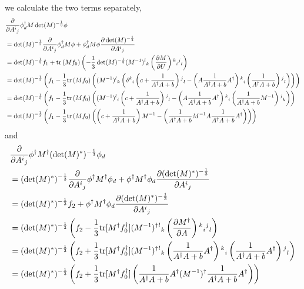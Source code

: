 we calculate the two terms separately,
\begin{equation}
\begin{split}
&\frac{\partial}{\partial A{}^i{}_j}\phi _d^{\dagger} M \det(M)^{-\frac{1}{3}}\phi\\
&=\det(M)^{-\frac{1}{3}} \frac{\partial}{\partial A{}^i{}_j}\phi _d^{\dagger} M \phi+\phi _d^{\dagger} M\phi \frac{\partial \det(M)^{-\frac{1}{3}}}{\partial A{}^i{}_j}\\
&=\det(M)^{-\frac{1}{3}} f_1+{\rm tr}\left(Mf_0\right) \left(-\frac{1}{3}\det(M)^{-\frac{1}{3}}(M^{-1}){}^l{}_k\left(\frac{\partial M}{\partial U}\right){}^k{}_i{}^j{}_l\right)\\
&=\det(M)^{-\frac{1}{3}}\left(f_1-\frac{1}{3}{\rm tr}\left(Mf_0\right) \left((M^{-1}){}^l{}_k\left(\delta {}^k{}_i  \left(c+\frac{1}{A^{\dagger}A+b}\right){}^j{}_l-\left(A\frac{1}{A^{\dagger}A+b}A^{\dagger}\right){}^k{}_i  \left(\frac{1}{A^{\dagger}A+b}\right){}^j{}_l\right)\right)\right)\\
&=\det(M)^{-\frac{1}{3}}\left(f_1-\frac{1}{3}{\rm tr}\left(Mf_0\right) \left((M^{-1}) {}^l{}_i  \left(c+\frac{1}{A^{\dagger}A+b}\right){}^j{}_l-\left(A\frac{1}{A^{\dagger}A+b}A^{\dagger}\right){}^k{}_i  \left(\frac{1}{A^{\dagger}A+b}M^{-1}\right){}^j{}_k\right)\right)\\
&=\det(M)^{-\frac{1}{3}}\left(f_1-\frac{1}{3}{\rm tr}\left(Mf_0\right) \left(\left(c+\frac{1}{A^{\dagger}A+b}\right)M^{-1}- \left(\frac{1}{A^{\dagger}A+b}M^{-1}A\frac{1}{A^{\dagger}A+b}A^{\dagger}\right)\right)\right)\\
\end{split}
\end{equation}
and
\begin{equation}
\begin{split}
&\frac{\partial}{\partial A{}^i{}_j}\phi ^{\dagger} M^{\dagger} (\det(M)^*)^{-\frac{1}{3}}\phi _d\\
&=(\det(M)^*)^{-\frac{1}{3}} \frac{\partial}{\partial A{}^i{}_j}\phi ^{\dagger} M^{\dagger} \phi _d +\phi^{\dagger}  M^{\dagger}\phi _d \frac{\partial (\det(M)^*)^{-\frac{1}{3}}}{\partial A{}^i{}_j}\\
&=(\det(M)^*)^{-\frac{1}{3}} f_2 +\phi^{\dagger}  M^{\dagger}\phi _d \frac{\partial (\det(M)^*)^{-\frac{1}{3}}}{\partial A{}^i{}_j}\\
&=(\det(M)^*)^{-\frac{1}{3}} \left(f_2 -\frac{1}{3}{\rm tr}[M^{\dagger}f_0^{\dagger}]  (M^{-1})^{\dagger}{}^l{}_k\left(\frac{\partial M^{\dagger}}{\partial A}\right){}^k{}_i{}^j{}_l\right)\\
&=(\det(M)^*)^{-\frac{1}{3}} \left(f_2 +\frac{1}{3}{\rm tr}[M^{\dagger}f_0^{\dagger}]  (M^{-1})^{\dagger}{}^l{}_k \left(\frac{1}{A^{\dagger}A+b}A^{\dagger}\right){}^k{}_i  \left(\frac{1}{A^{\dagger}A+b}A^{\dagger}\right){}^j{}_l \right)\\
&=(\det(M)^*)^{-\frac{1}{3}} \left(f_2 +\frac{1}{3}{\rm tr}[M^{\dagger}f_0^{\dagger}]   \left(\frac{1}{A^{\dagger}A+b}A^{\dagger}(M^{-1})^{\dagger}\frac{1}{A^{\dagger}A+b}A^{\dagger}\right) \right)\\
\end{split}
\end{equation}
